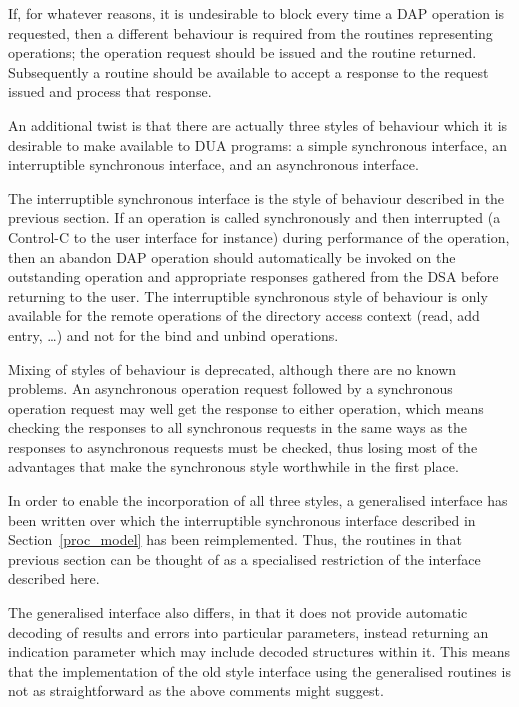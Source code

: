 If, for whatever reasons, it is undesirable to block every time a
DAP operation is requested, then a different behaviour is
required from the routines representing operations; the operation
request should be issued and the routine returned. Subsequently
a routine should be available to accept a response to the request
issued and process that response.

An additional twist is that there are actually three styles of
behaviour which it is desirable to make available to DUA programs:
a simple synchronous interface, an interruptible synchronous interface,
and an asyn\-chron\-ous interface.

The interruptible synchronous interface is the style of behaviour
described in the previous section. If an operation is called
synchronously and then interrupted (a Control-C to the user
interface for instance) during performance of the operation, then
an abandon DAP operation should automatically be invoked on the
outstanding operation and appropriate responses gathered from the
DSA before returning to the user.
The interruptible synchronous style of behaviour is only available
for the remote operations of the directory access context (read,
add entry, \ldots) and not for the bind and unbind operations.

Mixing of styles of behaviour is deprecated, although there are no
known problems. An asynchronous operation request followed by
a synchronous operation request may well get the response to either
operation, which means checking the responses to all synchronous
requests in the same ways as the responses to asynchronous requests
must be checked, thus losing most of the advantages that make the
synchronous style worthwhile in the first place.

In order to enable the incorporation of all three styles, a generalised
interface has been written over which the interruptible synchronous
interface described in Section~\ref{proc_model} has been reimplemented.
Thus, the routines in that previous section can be thought of as a
specialised restriction of the interface described here.

The generalised interface also differs, in that it does not provide
automatic decoding of results and errors into particular parameters,
instead returning an indication parameter which may include decoded
structures within it.
This means that the implementation of the old style interface using
the generalised routines is not as straightforward as the above
comments might suggest.

